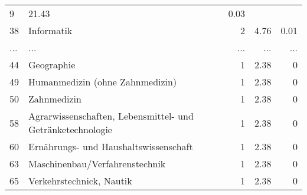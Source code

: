 \begin{longtable}{lXrrr}
          \num{9} &
          \num[round-mode=places,round-precision=2]{21,43} &
          \num[round-mode=places,round-precision=2]{0,03} \\
        38 & \multicolumn{1}{X}{Informatik} & %
          \num{2} &
          \num[round-mode=places,round-precision=2]{4,76} &
          \num[round-mode=places,round-precision=2]{0,01} \\
       ... & ... & ... & ... & ... \\
        44 & \multicolumn{1}{X}{Geographie} & %
          \num{1} &
          \num[round-mode=places,round-precision=2]{2,38} &
          \num[round-mode=places,round-precision=2]{0} \\

        49 & \multicolumn{1}{X}{Humanmedizin (ohne Zahnmedizin)} & %
          \num{1} &
          \num[round-mode=places,round-precision=2]{2,38} &
          \num[round-mode=places,round-precision=2]{0} \\

        50 & \multicolumn{1}{X}{Zahnmedizin} & %
          \num{1} &
          \num[round-mode=places,round-precision=2]{2,38} &
          \num[round-mode=places,round-precision=2]{0} \\

        58 & \multicolumn{1}{X}{Agrarwissenschaften, Lebensmittel- und Getränketechnologie} & %
          \num{1} &
          \num[round-mode=places,round-precision=2]{2,38} &
          \num[round-mode=places,round-precision=2]{0} \\

        60 & \multicolumn{1}{X}{Ernährungs- und Haushaltswissenschaft} & %
          \num{1} &
          \num[round-mode=places,round-precision=2]{2,38} &
          \num[round-mode=places,round-precision=2]{0} \\

        63 & \multicolumn{1}{X}{Maschinenbau/Verfahrenstechnik} & %
          \num{1} &
          \num[round-mode=places,round-precision=2]{2,38} &
          \num[round-mode=places,round-precision=2]{0} \\

        65 & \multicolumn{1}{X}{Verkehrstechnick, Nautik} & %
          \num{1} &
          \num[round-mode=places,round-precision=2]{2,38} &
          \num[round-mode=places,round-precision=2]{0} \\


\end{longtable}
